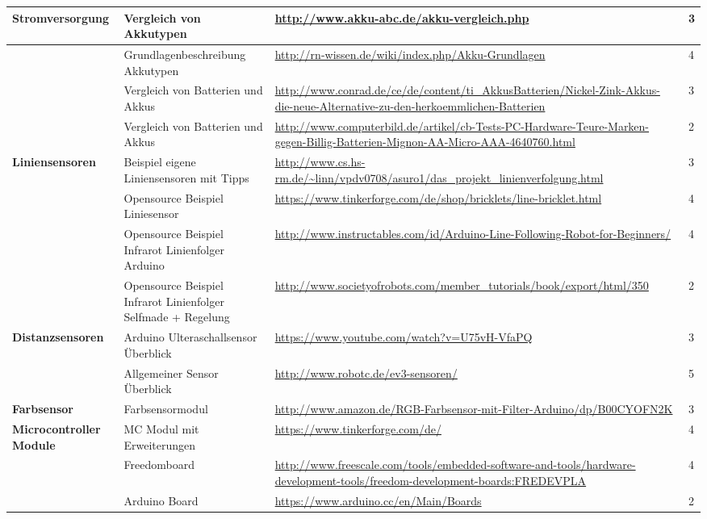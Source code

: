 \begin{table}[h]
\begin{tabular}{|p{3cm}|p{3.5cm}|p{5cm}|p{2cm}|}
\textbf{Stromversorgung}	&	Vergleich von Akkutypen	&	\url{http://www.akku-abc.de/akku-vergleich.php}	&	3 \\\hline
				 			&	Grundlagenbeschreibung Akkutypen 	&	\url{http://rn-wissen.de/wiki/index.php/Akku-Grundlagen}	&	4 \\\hline
				 			&	Vergleich von Batterien und Akkus	&	\url{http://www.conrad.de/ce/de/content/ti_AkkusBatterien/Nickel-Zink-Akkus-die-neue-Alternative-zu-den-herkoemmlichen-Batterien}	&	3 \\\hline
				 			&	Vergleich von Batterien und Akkus	&	\url{http://www.computerbild.de/artikel/cb-Tests-PC-Hardware-Teure-Marken-gegen-Billig-Batterien-Mignon-AA-Micro-AAA-4640760.html } & 2	\\\hline
				 			
				 			
\textbf{Liniensensoren}	&	Beispiel eigene Liniensensoren mit Tipps	&	\url{http://www.cs.hs-rm.de/~linn/vpdv0708/asuro1/das_projekt_linienverfolgung.html}	&	3 \\\hline
				 			&	Opensource Beispiel Liniesensor	&	\url{https://www.tinkerforge.com/de/shop/bricklets/line-bricklet.html}	&	4 \\\hline
 				 			&	Opensource Beispiel Infrarot Linienfolger Arduino	&	\url{http://www.instructables.com/id/Arduino-Line-Following-Robot-for-Beginners/}	&	4 \\\hline
 				 			&	Opensource Beispiel Infrarot Linienfolger Selfmade + Regelung	&	\url{http://www.societyofrobots.com/member_tutorials/book/export/html/350}	&	2 \\\hline
 \textbf{Distanzsensoren}	&	Arduino Ulteraschallsensor Überblick &	\url{https://www.youtube.com/watch?v=U75vH-VfaPQ}	&	3 \\\hline	
 							&	Allgemeiner Sensor Überblick &	\url{http://www.robotc.de/ev3-sensoren/}	&	5 \\\hline	


\textbf{Farbsensor}	&	Farbsensormodul	&	\url{http://www.amazon.de/RGB-Farbsensor-mit-Filter-Arduino/dp/B00CYOFN2K}	&	3 \\\hline			 		
\textbf{Microcontroller Module}	&	MC Modul mit Erweiterungen	&	\url{https://www.tinkerforge.com/de/}	&	4 \\\hline
					&	Freedomboard	&	\url{http://www.freescale.com/tools/embedded-software-and-tools/hardware-development-tools/freedom-development-boards:FREDEVPLA}	&	4 \\\hline
					&	Arduino Board &	\url{https://www.arduino.cc/en/Main/Boards}	&	2 \\\hline					
					

\end{tabular}
\end{table}
